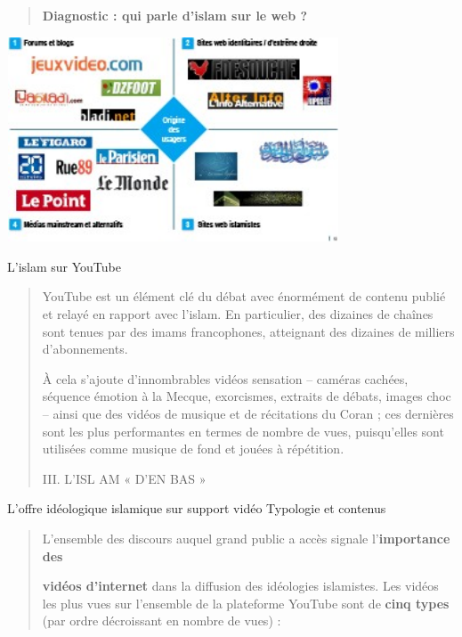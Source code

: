 \begin{quote}
\textbf{Diagnostic : qui parle d'islam sur le web ?}
\end{quote}

\includegraphics[width=3.88942in,height=2.3925in]{ImageIslamFrance/media/image10.jpeg}

L'islam sur YouTube

\begin{quote}
YouTube est un élément clé du débat avec énormément de contenu publié et
relayé en rapport avec l'islam. En particulier, des dizaines de chaînes
sont tenues par des imams francophones, atteignant des dizaines de
milliers d'abonnements.

À cela s'ajoute d'innombrables vidéos sensation -- caméras cachées,
séquence émotion à la Mecque, exorcismes, extraits de débats, images
choc -- ainsi que des vidéos de musique et de récitations du Coran ; ces
dernières sont les plus performantes en termes de nombre de vues,
puisqu'elles sont utilisées comme musique de fond et jouées à
répétition.

III. L'ISL AM « D'EN BAS »
\end{quote}

L'offre idéologique islamique sur support vidéo Typologie et contenus

\begin{quote}
L'ensemble des discours auquel grand public a accès signale
l'\textbf{importance des}

\textbf{vidéos d'internet} dans la diffusion des idéologies islamistes.
Les vidéos les plus vues sur l'ensemble de la plateforme YouTube sont de
\textbf{cinq types} (par ordre décroissant en nombre de vues) :
\end{quote}

